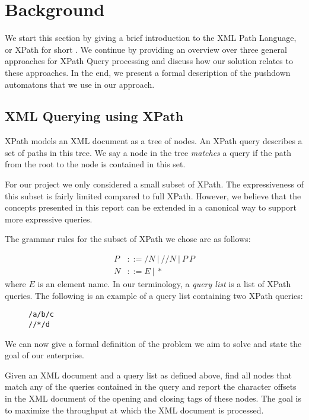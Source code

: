 \section{Background}\label{sec:background}
We start this section by giving a brief introduction to the XML Path Language,
or XPath for short \cite{xpathSpec}. We continue by providing an overview
over three general approaches for XPath Query processing and discuss how our
solution relates to these approaches. In the end, we present a formal description
of the pushdown automatons that we use in our approach.

\subsection{XML Querying using XPath}
XPath models an XML document as a tree of nodes. An XPath query describes a set
of paths in this tree. We say a node in the tree \emph{matches} a query if the
path from the root to the node is contained in this set.

For our project we only considered a small subset of XPath. The expressiveness
of this subset is fairly limited compared to full XPath. However, we believe
that the concepts presented in this report can be extended in a canonical way
to support more expressive queries.

The grammar rules for the subset of XPath we chose are as follows:

\begin{align*}
    P &::= /N\ |\ //N\ |\ P\ P\\
    N &::= E\ |\ *
\end{align*}
where $E$ is an element name. In our terminology, a \emph{query list} is a list
of XPath queries. The following is an example of a query list containing two
XPath queries:

\begin{figure}[htb]
\centering
\texttt{/a/b/c}\\
\texttt{//*/d}
\end{figure}

We can now give a formal definition of the problem we aim to solve and state
the goal of our enterprise. 

 Given an XML document and a query list as
defined above, find all nodes that match any of the queries contained in the
query and report the character offsets in the XML document of the opening and
closing tags of these nodes. The goal is to maximize the throughput at which
the XML document is processed.

